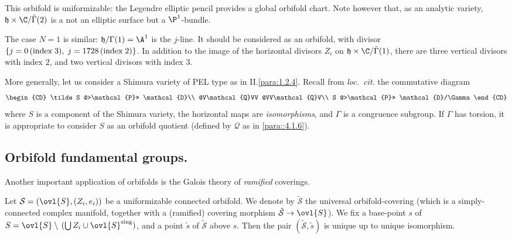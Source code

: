\begin{para}
This orbifold is uniformizable: the Legendre elliptic pencil provides a
global orbifold chart. Note however that, as an analytic variety,
$\mathfrak{h}\times\C/\tilde \Gamma(2)$ is a not an elliptic surface but
a $\P^1$-bundle.

The case $N=1$ is similar: $\mathfrak{h}/\Gamma(1)=\A^1$ is the $j$-line. It should be considered as an orbifold, with
divisor $\{j=0 \,{\rm(index \;3)} ,\;j=1728\,{\rm(index \;2)} \}$. In addition to the image of the horizontal divisors
$Z_i$ on $\mathfrak{h}\times\C/\tilde \Gamma(1)$, there are three vertical divisors with index $2$, and two vertical
divisors with index $3$.  


\end{para}

\begin{para}\label{para::4.1.8} More generally, let us consider a Shimura
 variety of PEL type as in II.\ref{para:1.2.4}.  Recall from {\it
 loc.~cit.} the commutative diagram
\begin{equation*}
\begin{CD}
 \tilde S @>\mathcal{P}>> \mathcal{D}\\
 @V\mathcal{Q}VV @VV\mathcal{Q}V\\
 S @>\mathcal{P}>> \mathcal{D}/\Gamma
\end{CD}
\end{equation*}
where $S$ is a component of the Shimura variety, the horizontal maps are
 {\it isomorphisms}, and $\Gamma$ is a congruence subgroup. If $\Gamma$
 has torsion, it is appropriate to consider $S$ as an orbifold quotient 
 (defined by $\mathcal{Q}$ as in \ref{para::4.1.6}). 
\end{para}


\subsection{Orbifold fundamental groups.}\label{sub::4.2}

\begin{para}\label{para::4.2.1} Another important application of orbifolds is
 the Galois theory of {\it ramified} coverings.   

  Let $\mathcal{S}=(\ovl{S}, (Z_i,e_i))$ be a uniformizable connected
orbifold. We denote by $\tilde{\mathcal{S}}$ the universal
orbifold-covering (which is a simply-connected complex manifold,
together with a (ramified) covering morphism $\tilde{\mathcal{S}}\to
\ovl{S}$). We fix a base-point $s$ of $S =\ovl{S}\setminus \,(\bigcup
Z_i\cup\ovl{S}^{\mathrm{sing}})$, and a point $\tilde s$ of $\tilde{\mathcal{S}}$
above $s$. Then the pair $(\tilde{\mathcal{S}},\tilde s)$ is unique up to
unique isomorphism.
\end{para}

